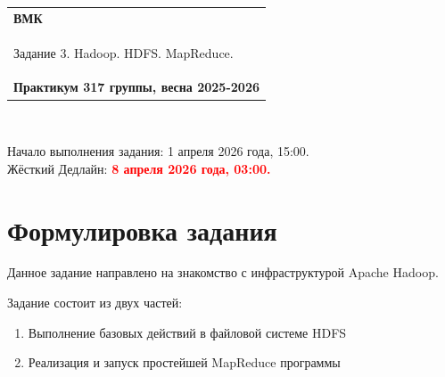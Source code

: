 \documentclass[10pt,fleqn]{article}
\begin{document}
\begin{center}
    \begin{tabular}{|p{17.5cm}|}
        \hline
        \textbf{ВМК}\\
        \begin{center} \Large Задание 3. Hadoop. HDFS. MapReduce. \end{center}\\
        \textbf{Практикум 317 группы, весна 2025-2026}\\
        \hline
    \end{tabular}
\end{center}

\

\begin{tabbing}
    Начало выполнения задания: 1 апреля 2026 года, 15:00.\\
    Жёсткий Дедлайн: \textcolor{red}{\bf 8 апреля 2026 года, 03:00.}
\end{tabbing}


\section*{Формулировка задания}
Данное задание направлено на знакомство с инфраструктурой Apache Hadoop.


Задание состоит из двух частей:
\begin{enumerate}
 \item Выполнение базовых действий в файловой системе HDFS
 \item Реализация и запуск простейшей MapReduce программы
\end{enumerate}
\end{document}
